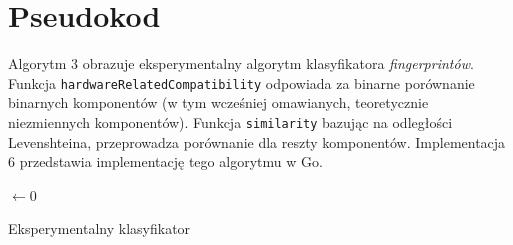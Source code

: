 

\section{Pseudokod}
Algorytm 3 obrazuje eksperymentalny algorytm klasyfikatora \emph{fingerprintów}.
Funkcja \texttt{hardwareRelatedCompatibility} odpowiada za binarne porównanie
binarnych komponentów (w tym wcześniej omawianych, teoretycznie niezmiennych
komponentów). Funkcja \texttt{similarity} bazując na odległości Levenshteina,
przeprowadza porównanie dla reszty komponentów. Implementacja 6 przedstawia
implementację tego algorytmu w Go.


\begin{algorithm}
	\SetAlgoVlined
	\BlankLine
	\BlankLine
	\VarMax $\leftarrow 0$\;
	\ForEach{\VarG $\in$ \SetG}{
		\If{\HardwareRelatedCompatibility{\VarF, \VarG} $< \alpha$}{
			\Continue\;
		}
		\BlankLine
		\VarRatio $\leftarrow$ \Similarity{\VarF, \VarG}\;
		\BlankLine
		\If{\VarRatio $>$ \VarMax}{
			\VarMax $\leftarrow$ \VarRatio\;
			\VarCandidate $\leftarrow$ \VarG\;
		}
	}
	\If{\VarMax $\ge \beta$}{
		\Return{\VarCandidate}\;
	}
	\Return{\Null}\;
	\caption{Eksperymentalny klasyfikator}
\end{algorithm}

